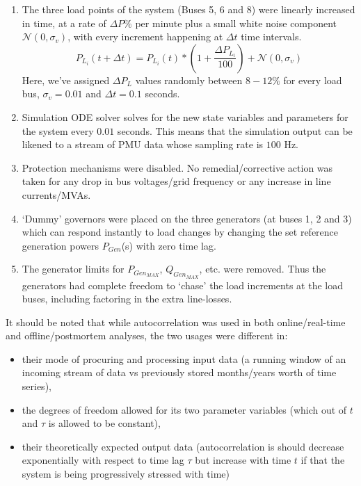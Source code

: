 \begin{enumerate}
	\item The three load points of the system (Buses 5, 6 and 8) were linearly increased in time, at a rate of $\Delta P \%$ per minute plus a small white noise component $\mathcal{N}(0, \sigma_v)$, with every increment happening at $\Delta t$ time intervals. 
	\begin{equation}
		P_{L_i}(t+\Delta t) = P_{L_i}(t)*\left(1+ \frac{\Delta P_{L_i}}{100}\right) + \mathcal{N}(0, \sigma_v)
	\end{equation} 
	Here, we've assigned $\Delta P_{L}$ values randomly between $8-12\%$ for every load bus, $\sigma_v = 0.01$ and $\Delta t = 0.1$ seconds.
	\item Simulation ODE solver solves for the new state variables and parameters for the system every $0.01$ seconds. This means that the simulation output can be likened to a stream of PMU data whose sampling rate is $100$ Hz.
	\item Protection mechanisms were disabled. No remedial/corrective action was taken for any drop in bus voltages/grid frequency or any increase in line currents/MVAs.
	\item `Dummy' governors were placed on the three generators (at buses 1, 2 and 3) which can respond instantly to load changes by changing the set reference generation powers $P_{Gen}$(s) with zero time lag.
	\item The generator limits for $P_{Gen_{MAX}}$, $Q_{Gen_{MAX}}$, etc. were removed. Thus the generators had complete freedom to `chase' the load increments at the load buses, including factoring in the extra line-losses.
\end{enumerate} 

It should be noted that while autocorrelation was used in both online/real-time and offline/postmortem analyses, the two usages were different in:

\begin{itemize}
	\item their mode of procuring and processing input data (a running window of an incoming stream of data vs previously stored months/years worth of time series),
	\item the degrees of freedom allowed for its two parameter variables (which out of $t$ and $\tau$ is allowed to be constant),
	\item their theoretically expected output data (autocorrelation is should decrease exponentially with respect to time lag $\tau$ but increase with time $t$ if that the system is being progressively stressed with time)
\end{itemize} 
 
